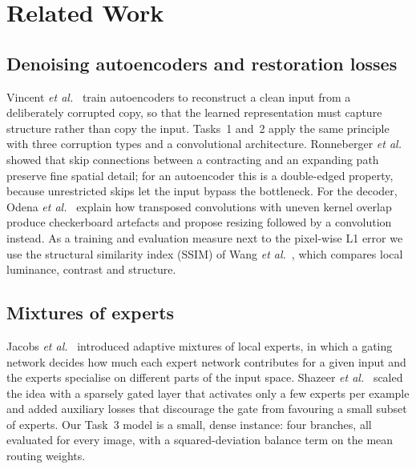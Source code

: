 \documentclass[conference]{IEEEtran}
\begin{document}
\section{Related Work}
\label{sec:related}

\subsection{Denoising autoencoders and restoration losses}
Vincent \emph{et al.}~\cite{vincent2008extracting} train autoencoders to
reconstruct a clean input from a deliberately corrupted copy, so that the
learned representation must capture structure rather than copy the input.
Tasks~1 and~2 apply the same principle with three corruption types and a
convolutional architecture. Ronneberger \emph{et
al.}~\cite{ronneberger2015unet} showed that skip connections between a
contracting and an expanding path preserve fine spatial detail; for an
autoencoder this is a double-edged property, because unrestricted skips
let the input bypass the bottleneck. For the decoder, Odena \emph{et
al.}~\cite{odena2016deconvolution} explain how transposed convolutions with
uneven kernel overlap produce checkerboard artefacts and propose resizing
followed by a convolution instead. As a training and evaluation measure
next to the pixel-wise L1 error we use the structural similarity index
(SSIM) of Wang \emph{et al.}~\cite{wang2004ssim}, which compares local
luminance, contrast and structure.

\subsection{Mixtures of experts}
Jacobs \emph{et al.}~\cite{jacobs1991adaptive} introduced adaptive
mixtures of local experts, in which a gating network decides how much each
expert network contributes for a given input and the experts specialise on
different parts of the input space. Shazeer \emph{et
al.}~\cite{shazeer2017outrageously} scaled the idea with a sparsely gated
layer that activates only a few experts per example and added auxiliary
losses that discourage the gate from favouring a small subset of experts.
Our Task~3 model is a small, dense instance: four branches, all evaluated
for every image, with a squared-deviation balance term on the mean routing
weights.
\end{document}
